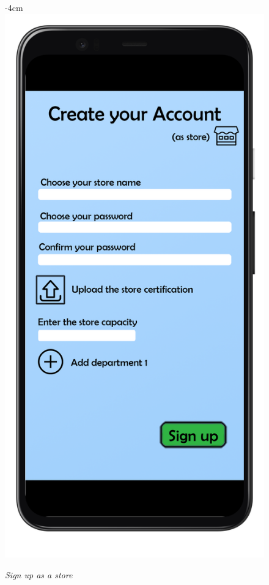 \documentclass{article}
\begin{document}
		\begin{figure}[H]
			\begin{adjustwidth} {-4cm}{}
				\centering
				\includegraphics[scale=0.45]{../Mockups/SignUpStore.png}\\
			\end{adjustwidth}
			\caption{\emph{Sign up as a store}}
		\end{figure}
	
\end{document}
